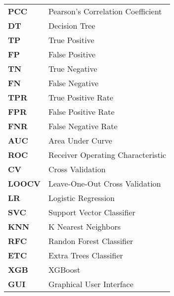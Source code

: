 \begin{appendix}
\begin{table}[H]
\centering
\begin{tabular}{ll}
\textbf{PCC}  &      Pearson's Correlation Coefficient \\
\textbf{DT}  &      Decision Tree \\
\textbf{TP}  &       True Positive\\
\textbf{FP}  &      False Positive \\
\textbf{TN}  &      True Negative \\
\textbf{FN}  &      False Negative \\
\textbf{TPR}  &     True Positive Rate  \\
\textbf{FPR}  &     False Positive Rate  \\
\textbf{FNR}  &     False Negative Rate  \\
\textbf{AUC}  &     Area Under Curve  \\
\textbf{ROC}  &     Receiver Operating Characteristic  \\
\textbf{CV}  &      Cross Validation \\
\textbf{LOOCV}  &      Leave-One-Out Cross Validation \\
\textbf{LR}  &      Logistic Regression \\
\textbf{SVC}  &      Support Vector Classifier \\
\textbf{KNN}  &      K Nearest Neighbors \\
\textbf{RFC}  &      Randon Forest Classifier \\
\textbf{ETC}  &     Extra Trees Classifier  \\
\textbf{XGB}  &     XGBoost  \\
\textbf{GUI}  &     Graphical User Interface  \\
\end{tabular}
\end{table}

\end{appendix}

